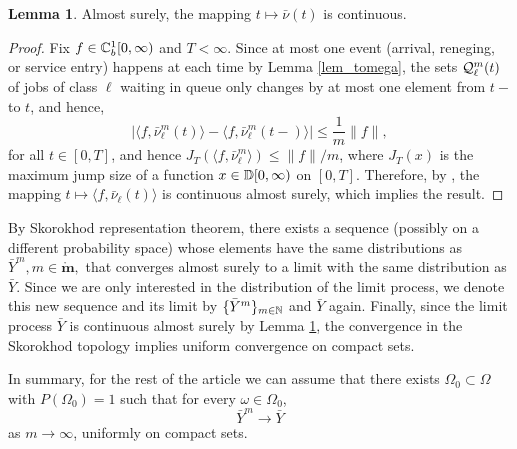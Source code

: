 \documentclass{article}
\theoremstyle{definition}
\newtheorem{lemma}[theorem]{Lemma}
\numberwithin{equation}{section}
\begin{document}
\begin{lemma}\label{lem_Ycont}
Almost surely, the mapping $t\mapsto\bar\nu(t)$ is continuous.
\end{lemma}
\begin{proof}
Fix $f\in\mathbb{C}_b^{1}[0,\infty)$ and $T<\infty$. Since at most one event (arrival, reneging, or service entry) happens at each time by Lemma \ref{lem_tomega}, the sets $\mathcal{Q}_\ell^m(t)$  of jobs of class $\ell$ waiting in queue only changes by at most one element from $t-$ to $t$, and hence, 
\[ |\langle f,\bar\nu^m_\ell(t) \rangle  - \langle f, \bar\nu_\ell^m(t-)\rangle | \leq \frac{1}{m}\|f\|,\]
for all $t\in[0,T]$, and hence $J_T(\langle f,\bar\nu_\ell^m\rangle )\leq \|f\|/m$, where $J_T(x)$ is the maximum jump size of a function $x\in\mathbb{D}[0,\infty)$ on $[0,T]$. Therefore, by \cite[Theorem 13.4]{BillingsleyBook}, the mapping $t\mapsto\langle f,\bar\nu_\ell(t)\rangle$ is continuous almost surely, which implies the result.
\end{proof}
By Skorokhod representation theorem, there exists a sequence (possibly on a different probability space) whose elements have the same distributions as $\bar Y^m, m\in\mathbf{\mathring{m}},$ that converges almost surely to a limit with the same distribution as $\bar Y$. Since we are only interested in the distribution of the limit process, we denote this new sequence and its limit by $\{\bar Y^m\}_{m\in\mathbb{N}}$ and $\bar Y$ again. Finally, since the limit process $\bar Y$ is continuous almost surely by Lemma \ref{lem_Ycont}, the convergence in the Skorokhod topology implies uniform convergence on compact sets.

In summary, for the rest of the article we can assume that there exists $\Omega_0\subset\Omega$ with $P(\Omega_0)=1$ such that for every $\omega \in \Omega_0$,
\begin{equation}\label{converge}
\bar Y^m \to \bar Y
\end{equation}
as $m\to\infty$, uniformly on compact sets.
\end{document}
